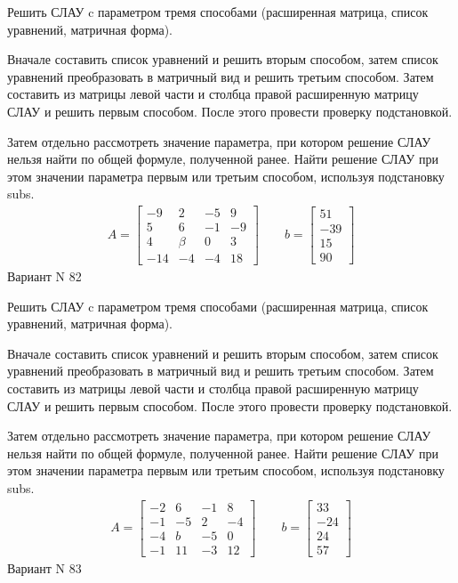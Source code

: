 \documentclass[11pt]{report}
\begin{document}
Решить СЛАУ c параметром тремя способами (расширенная матрица, список уравнений, матричная форма).

Вначале составить список уравнений и решить вторым способом,
затем список уравнений преобразовать в матричный вид и решить третьим способом.
Затем составить из матрицы левой части и столбца правой расширенную матрицу СЛАУ и решить первым способом.
После этого провести проверку подстановкой.

Затем отдельно рассмотреть значение параметра, при котором решение СЛАУ нельзя найти по общей формуле,
полученной ранее.
Найти решение СЛАУ при этом значении параметра первым или третьим способом, используя подстановку subs.
\begin{align*}
    A = \left[\begin{matrix}-9 & 2 & -5 & 9\\5 & 6 & -1 & -9\\4 & \beta & 0 & 3\\-14 & -4 & -4 & 18\end{matrix}\right]
\qquad b = \left[\begin{matrix}51\\-39\\15\\90\end{matrix}\right]
\end{align*}
\newpage
Вариант N 82


Решить СЛАУ c параметром тремя способами (расширенная матрица, список уравнений, матричная форма).

Вначале составить список уравнений и решить вторым способом,
затем список уравнений преобразовать в матричный вид и решить третьим способом.
Затем составить из матрицы левой части и столбца правой расширенную матрицу СЛАУ и решить первым способом.
После этого провести проверку подстановкой.

Затем отдельно рассмотреть значение параметра, при котором решение СЛАУ нельзя найти по общей формуле,
полученной ранее.
Найти решение СЛАУ при этом значении параметра первым или третьим способом, используя подстановку subs.
\begin{align*}
    A = \left[\begin{matrix}-2 & 6 & -1 & 8\\-1 & -5 & 2 & -4\\-4 & b & -5 & 0\\-1 & 11 & -3 & 12\end{matrix}\right]
\qquad b = \left[\begin{matrix}33\\-24\\24\\57\end{matrix}\right]
\end{align*}
\newpage
Вариант N 83
\end{document}
